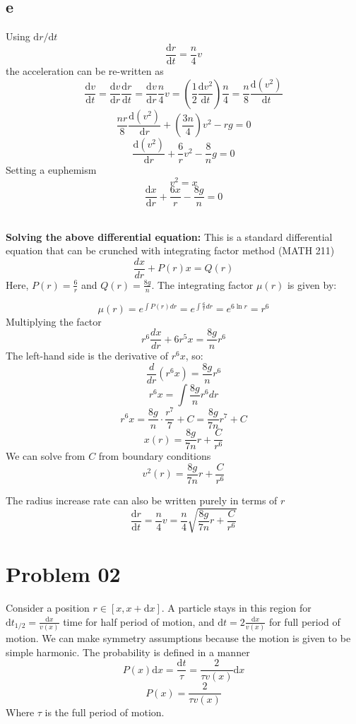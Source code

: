 \documentclass[letter]{article}
\begin{document}
\subsection*{e} 
Using $\mathrm{d} r / \mathrm{d} t$ 
\[
\frac{\mathrm{d} r}{\mathrm{d} t} = \frac{n}{4} v
\]
the acceleration can be re-written as 
\[
\frac{\mathrm{d} v}{\mathrm{d} t} = \frac{\mathrm{d} v}{\mathrm{d} r} \frac{\mathrm{d} r}{\mathrm{d} t} = \frac{\mathrm{d} v}{\mathrm{d} r} \frac{n}{4} v  = \left(\frac{1}{2} \frac{\mathrm{d} v^2}{\mathrm{d} t}\right) \frac{n}{4} = \frac{n}{8} \frac{\mathrm{d} (v^2 )}{\mathrm{d} t}
\] 
\[
	\frac{nr}{8} \frac{\mathrm{d} (v^2)}{\mathrm{d} r} + \left(\frac{3n}{4}\right) v^2 - rg = 0
\]
\[
\frac{\mathrm{d} (v^2)}{\mathrm{d} r} + \frac{6}{r} v^2 - \frac{8}{n} g = 0
\] 
Setting a euphemism 
\[
v^2 = x
\] 
\[
\boxed{
\frac{\mathrm{d} x}{\mathrm{d} r} + \frac{6x}{r} - \frac{8g}{n} = 0
}
\] 
\
\begin{tcolorbox}[colback=white,colframe=gray,sharp corners]
	\textbf{Solving the above differential equation: }
This is a standard differential equation that can be crunched with integrating factor method (MATH 211)
\[
\frac{dx}{dr} + P(r)x = Q(r)
\]
Here, \( P(r) = \frac{6}{r} \) and \( Q(r) = \frac{8g}{n} \).
The integrating factor \( \mu(r) \) is given by:

\[
\mu(r) = e^{\int P(r) dr} = e^{\int \frac{6}{r} dr} = e^{6 \ln r} = r^6
\]
Multiplying the factor
\[
r^6 \frac{dx}{dr} + 6r^5x = \frac{8g}{n} r^6
\]
The left-hand side is the derivative of \( r^6x \), so:
\[
\frac{d}{dr}(r^6x) = \frac{8g}{n}r^6
\]
\[
r^6x = \int \frac{8g}{n}r^6 dr
\]
\[
r^6x = \frac{8g}{n} \cdot \frac{r^7}{7} + C = \frac{8g}{7n}r^7 + C
\]
\[
x(r) = \frac{8g}{7n}r + \frac{C}{r^6}
\]
We can solve from $C$ from boundary conditions 
\[
\boxed{
v^2 (r) = \frac{8g}{7n} r + \frac{C}{r^{6}}
}
\] 
\end{tcolorbox}
	The radius increase rate can also be written purely in terms of $r$ \[
	\frac{\mathrm{d} r}{\mathrm{d} t} = \frac{n}{4} v = \frac{n}{4} \sqrt{\frac{8g}{7n} r + \frac{C}{r^{6}}} 
	\] 



	\section{Problem 02} 

	Consider a position $r \in  [x,  x + \mathrm{d} x]$. A particle stays in this region for $\mathrm{d} t_{1 / 2 } = \frac{\mathrm{d} x}{v(x)}$ time for half period of motion, and $ \mathrm{d} t = 2 \frac{\mathrm{d} x}{v(x)}$ for full period of motion. We can make symmetry assumptions because the motion is given to be simple harmonic. 
	The probability is defined in a manner
	\[
	P(x) \mathrm{d} x = \frac{\mathrm{d} t}{\tau} = \frac{2}{\tau v(x)} \mathrm{d} x 
	\]
	\[
	\boxed{
	P(x) = \frac{2}{\tau v(x)}
	}
	\] Where $\tau$ is the full period of motion.
\end{document}
